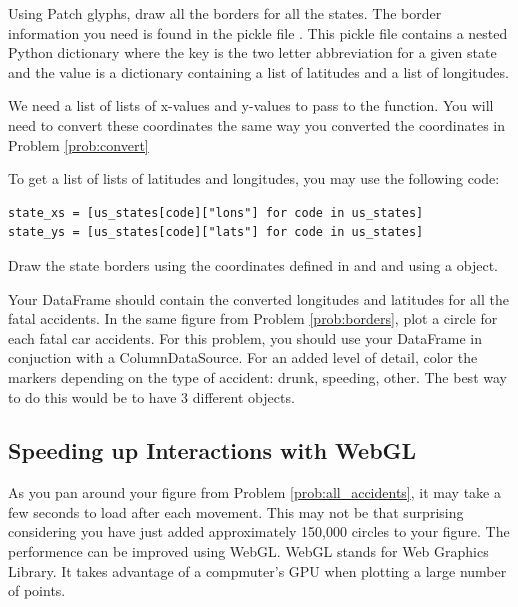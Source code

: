 \begin{problem} \label{prob:borders}
Using Patch glyphs, draw all the borders for all the
states. The border information you need is found in the pickle file
. This pickle file contains a nested Python dictionary
where the key is the two letter abbreviation for a given state and the value is
a dictionary containing a list of latitudes and a list of longitudes.

We need a list of lists of x-values and y-values to pass to the
 function. You will need to convert these coordinates the
same way you converted the coordinates in Problem \ref{prob:convert}

To get a list of lists of latitudes and longitudes, you may use the following
code:

\begin{lstlisting}
state_xs = [us_states[code]["lons"] for code in us_states]
state_ys = [us_states[code]["lats"] for code in us_states]
\end{lstlisting}

Draw the state borders using the coordinates defined in  and
 and using a  object.
\end{problem}

\begin{problem} \label{prob:all_accidents}
Your  DataFrame should contain the converted longitudes and
latitudes for all the fatal accidents.
In the same figure from Problem \ref{prob:borders},
plot a circle for each fatal car accidents. For this problem, you should use
your  DataFrame in conjuction with a ColumnDataSource. For an
added level of detail, color the markers depending on the type of accident:
drunk, speeding, other. The best way to do this would be to have 3 different
 objects.
\end{problem}

\subsection*{Speeding up Interactions with WebGL}
As you pan around your figure from Problem \ref{prob:all_accidents}, it may take
a few seconds to load after each movement. This may not be that surprising
considering you have just added approximately 150,000 circles to your figure.
The performence can be improved using WebGL. WebGL stands for Web Graphics
Library. It takes advantage of a compmuter's GPU when plotting a large number of
points.

